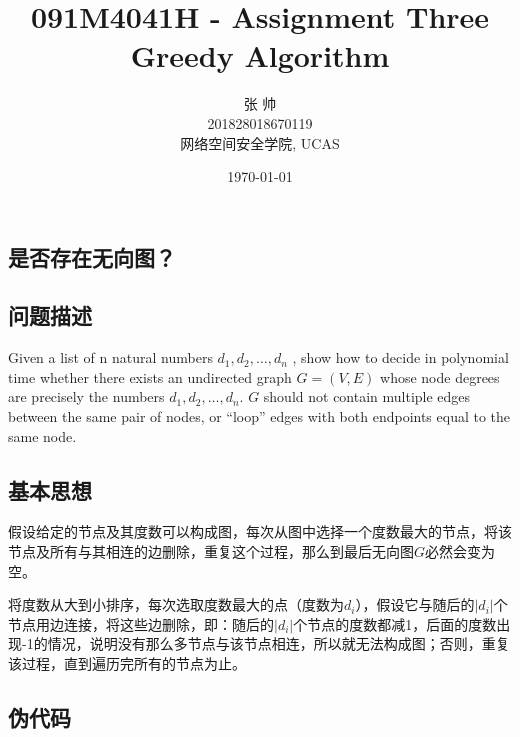 \documentclass[UTF8,a4paper,12pt]{article}
\title{091M4041H - Assignment Three\\Greedy Algorithm}
\date{\today}
\author{张   帅\\201828018670119\\网络空间安全学院, UCAS}
\begin{document}
	\begin{CJK}{UTF8}{gkai}
		\maketitle
	\section{是否存在无向图？}
	\subsection{问题描述}
	
		Given a list of n natural numbers $ d_{1},d_{2},\dots,d_{n} $ , show how to decide in polynomial time whether there exists an undirected graph $ G = (V, E) $ whose node degrees are precisely the numbers $ d_{1},d_{2},\dots,d_{n} $. $ G $ should not contain multiple edges between the same pair of nodes, or “loop” edges with both endpoints equal to the same node.
	
	\subsection{基本思想}
		
		假设给定的节点及其度数可以构成图，每次从图中选择一个度数最大的节点，将该节点及所有与其相连的边删除，重复这个过程，那么到最后无向图$ G $必然会变为空。
		
		将度数从大到小排序，每次选取度数最大的点（度数为$ d_{i} $），假设它与随后的$ |d_{i}| $个节点用边连接，将这些边删除，即：随后的$ |d_{i}| $个节点的度数都减1，后面的度数出现-1的情况，说明没有那么多节点与该节点相连，所以就无法构成图；否则，重复该过程，直到遍历完所有的节点为止。
		
	\subsection{伪代码}
	

\end{CJK}
\end{document}
